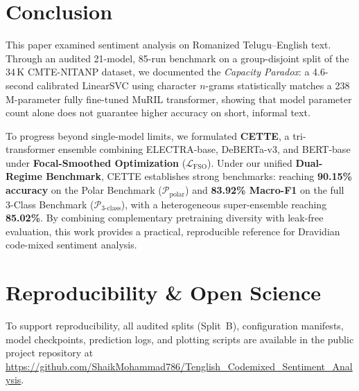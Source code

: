 \documentclass[10pt,conference]{IEEEtran}
\begin{document}
\section{Conclusion}
This paper examined sentiment analysis on Romanized Telugu--English text. Through an audited 21-model, 85-run benchmark on a group-disjoint split of the 34\,K CMTE-NITANP dataset, we documented the \emph{Capacity Paradox}: a 4.6-second calibrated LinearSVC using character $n$-grams statistically matches a 238\,M-parameter fully fine-tuned MuRIL transformer, showing that model parameter count alone does not guarantee higher accuracy on short, informal text.

To progress beyond single-model limits, we formulated \textbf{CETTE}, a tri-transformer ensemble combining ELECTRA-base, DeBERTa-v3, and BERT-base under \textbf{Focal-Smoothed Optimization} ($\mathcal{L}_{\text{FSO}}$). Under our unified \textbf{Dual-Regime Benchmark}, CETTE establishes strong benchmarks: reaching \textbf{90.15\% accuracy} on the Polar Benchmark ($\mathcal{P}_{\text{polar}}$) and \textbf{83.92\% Macro-F1} on the full 3-Class Benchmark ($\mathcal{P}_{\text{3-class}}$), with a heterogeneous super-ensemble reaching \textbf{85.02\%}. By combining complementary pretraining diversity with leak-free evaluation, this work provides a practical, reproducible reference for Dravidian code-mixed sentiment analysis.

\section*{Reproducibility \& Open Science}
To support reproducibility, all audited splits (Split~B), configuration manifests, model checkpoints, prediction logs, and plotting scripts are available in the public project repository at \url{https://github.com/ShaikMohammad786/Tenglish_Codemixed_Sentiment_Analysis}.
\end{document}
